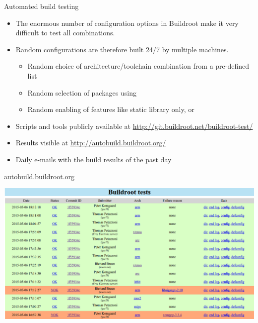 \begin{frame}{Automated build testing}
  \begin{itemize}
  \item The enormous number of configuration options in Buildroot make
    it very difficult to test all combinations.
  \item Random configurations are therefore built 24/7 by multiple
    machines.
    \begin{itemize}
    \item Random choice of architecture/toolchain combination from a
      pre-defined list
    \item Random selection of packages using 
    \item Random enabling of features like static library only, or
    \end{itemize}
  \item Scripts and tools publicly available at
    \url{http://git.buildroot.net/buildroot-test/}
  \item Results visible at \url{http://autobuild.buildroot.org/}
  \item Daily e-mails with the build results of the past day
  \end{itemize}
\end{frame}

\begin{frame}{autobuild.buildroot.org}
  \begin{center}
    \includegraphics[width=\textwidth]{slides/buildroot-support-contribution/autobuild.png}
  \end{center}
\end{frame}

